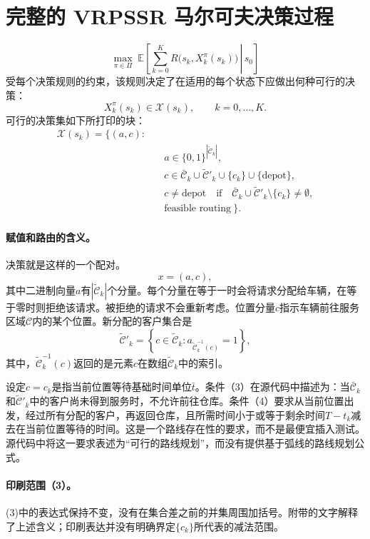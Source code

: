 \documentclass{article}
\begin{document}
\section*{完整的 VRPSSR 马尔可夫决策过程}

\[
\max_{\pi\in\Pi}\;
\mathbb{E}\left[\left.\sum_{k=0}^{K}
R\bigl(s_k,X_k^{\pi}(s_k)\bigr)\,\right|\,s_0\right]
\]
受每个决策规则的约束，该规则决定了在适用的每个状态下应做出何种可行的决策：
\[
X_k^{\pi}(s_k)\in\mathcal{X}(s_k),\qquad k=0,\ldots,K.
\]
可行的决策集如下所打印的块：
\begin{align}
\mathcal{X}(s_k)=\bigl\{(a,c):\quad & \nonumber\\[-1.5ex]
&a\in\{0,1\}^{|\tilde{\mathcal{C}}_k|}, \tag{1}\\
&c\in\bar{\mathcal{C}}_k\cup\tilde{\mathcal{C}}'_k
       \cup\{c_k\}\cup\{\text{depot}\}, \tag{2}\\
&c\neq\text{depot}\quad\text{if}\quad
 \bar{\mathcal{C}}_k\cup\tilde{\mathcal{C}}'_k\setminus\{c_k\}
 \neq\emptyset, \tag{3}\\
&\text{feasible routing}\ \bigr\}. \tag{4}
\end{align}

\paragraph{赋值和路由的含义。}
决策就是这样的一个配对。
\[
x=(a,c),
\]
其中二进制向量$a$有$|\tilde{\mathcal{C}}_k|$个分量。每个分量在等于一时会将请求分配给车辆，在等于零时则拒绝该请求。被拒绝的请求不会重新考虑。位置分量$c$指示车辆前往服务区域$\mathcal{C}$内的某个位置。新分配的客户集合是
\[
\tilde{\mathcal{C}}'_k
=\left\{c\in\tilde{\mathcal{C}}_k:
 a_{\tilde{\mathcal{C}}_k^{-1}(c)}=1\right\},
\]
其中，$\tilde{\mathcal{C}}_k^{-1}(c)$返回的是元素$c$在数组$\tilde{\mathcal{C}}_k$中的索引。

设定$c=c_k$是指当前位置等待基础时间单位$\bar t$。条件（3）在源代码中描述为：当$\bar{\mathcal{C}}_k$和$\tilde{\mathcal{C}}'_k$中的客户尚未得到服务时，不允许前往仓库。条件（4）要求从当前位置出发，经过所有分配的客户，再返回仓库，且所需时间小于或等于剩余时间$T-t_k$减去在当前位置等待的时间。这是一个路线存在性的要求，而不是最便宜插入测试。源代码中将这一要求表述为“可行的路线规划”，而没有提供基于弧线的路线规划公式。

\paragraph{印刷范围（3）。}
(3)中的表达式保持不变，没有在集合差之前的并集周围加括号。附带的文字解释了上述含义；印刷表达并没有明确界定$\{c_k\}$所代表的减法范围。
\end{document}

